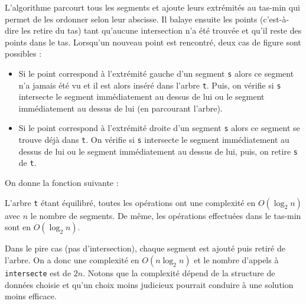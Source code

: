L'algorithme parcourt tous les segments et ajoute leurs extrémités au tas-min qui permet de les ordonner selon leur abscisse. Il balaye ensuite les points (c'est-à-dire les retire du tas) tant qu'aucune intersection n'a été trouvée et qu'il reste des points dans le tas. Lorsqu'un nouveau point est rencontré, deux cas de figure sont possibles :
\begin{itemize}
    \item Si le point correspond à l'extrémité gauche d'un segment \texttt{s} alors ce segment n'a jamais été vu et il est alors inséré dans l'arbre \texttt{t}. Puis, on vérifie si \texttt{s} intersecte le segment immédiatement au dessus de lui ou le segment immédiatement au dessus de lui (en parcourant l'arbre).
    \item Si le point correspond à l'extrémité droite d'un segment \texttt{s} alors ce segment se trouve déjà dans \texttt{t}. On vérifie si \texttt{s} intersecte le segment immédiatement au dessus de lui ou le segment immédiatement au dessus de lui, puis, on retire \texttt{s} de \texttt{t}.
\end{itemize}
\medskip

On donne la fonction suivante :



L'arbre \texttt{t} étant équilibré, toutes les opérations ont une complexité en $O(\log_2n)$ avec $n$ le nombre de segments. De même, les opérations effectuées dans le tas-min sont en $O(\log_2n)$.
\medskip

Dans le pire cas (pas d'intersection), chaque segment est ajouté puis retiré de l'arbre. On a donc une complexité en $O(n\log_2n)$ et le nombre d'appels à \texttt{intersecte} est de $2n$. Notons que la complexité dépend de la structure de données choisie et qu'un choix moins judicieux pourrait conduire à une solution moins efficace.
\bigskip

\Fin
